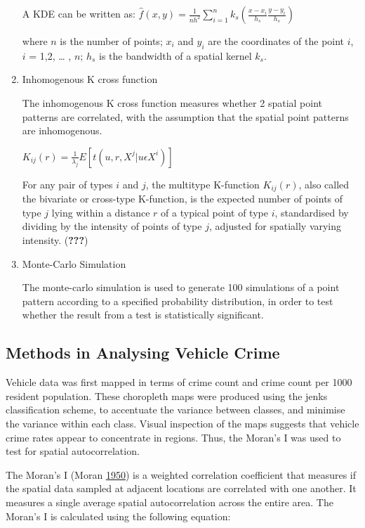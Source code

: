 \documentclass[]{article}
\theoremstyle{definition}
\theoremstyle{definition}
\theoremstyle{definition}
\theoremstyle{remark}
\begin{document}
\begin{enumerate}
  A KDE can be written as:
  \(\hat{f}(x,y)=\frac{1}{nh^2}\sum_{i=1}^nk_s(\frac{x-x_i}{h_s}\frac{y-y_i}{h_s})\)

  where \(n\) is the number of points; \(x_{i}\) and \(y_{i}\) are the
  coordinates of the point \(i\), \(i\) = 1,2, \ldots{} , \(n\);
  \(h_{s}\) is the bandwidth of a spatial kernel \(k_{s}\).
\item
  Inhomogenous K cross function

  The inhomogenous K cross function measures whether 2 spatial point
  patterns are correlated, with the assumption that the spatial point
  patterns are inhomogenous.

  \(K_{ij}(r) = \frac{1}{\lambda_{j}}E[t(u,r,X^{j} | u \epsilon X^{i} )]\)

  For any pair of types \(i\) and \(j\), the multitype K-function
  \(K_{ij}(r)\), also called the bivariate or cross-type K-function, is
  the expected number of points of type \(j\) lying within a distance
  \(r\) of a typical point of type \(i\), standardised by dividing by
  the intensity of points of type \(j\), adjusted for spatially varying
  intensity. ({\textbf{???}})
\item
  Monte-Carlo Simulation

  The monte-carlo simulation is used to generate 100 simulations of a
  point pattern according to a specified probability distribution, in
  order to test whether the result from a test is statistically
  significant.
\end{enumerate}

\subsection{Methods in Analysing Vehicle
Crime}\label{methods-in-analysing-vehicle-crime}

Vehicle data was first mapped in terms of crime count and crime count
per 1000 resident population. These choropleth maps were produced using
the jenks classification scheme, to accentuate the variance between
classes, and minimise the variance within each class. Visual inspection
of the maps suggests that vehicle crime rates appear to concentrate in
regions. Thus, the Moran's I was used to test for spatial
autocorrelation.

The Moran's I (Moran \protect\hyperlink{ref-Moran1950}{1950}) is a
weighted correlation coefficient that measures if the spatial data
sampled at adjacent locations are correlated with one another. It
measures a single average spatial autocorrelation across the entire
area. The Moran's I is calculated using the following equation:
\end{document}
